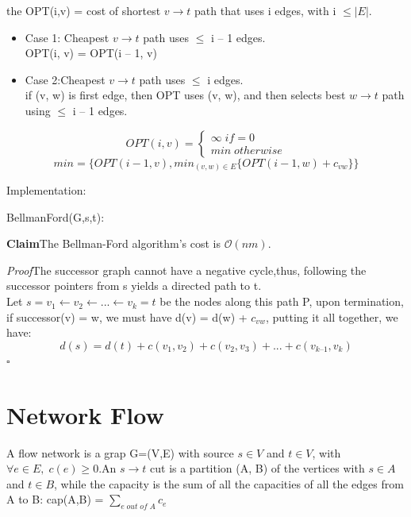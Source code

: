 \documentclass[11pt]{article}
\newenvironment{claim}[1]{\par\textbf{Claim}\space#1}{}
\newenvironment{proof}[1]{\par\textit{Proof}\space#1}{\hfill\ensuremath{\square}}
\begin{document}
the OPT(i,v) = cost of shortest $v\rightarrow t$ path that uses i edges, with i $\leq |E|$.

\begin{itemize}

\item {Case 1: Cheapest  $v\rightarrow t$ path uses $\leq$ i – 1 edges.}\\
OPT(i, v) = OPT(i – 1, v)

\item {Case 2:Cheapest  $v\rightarrow t$ path uses $\leq$ i edges.}\\
if (v, w) is first edge, then OPT uses (v, w), and then selects best $w \rightarrow t$ path using $\leq$ i – 1 edges.


\end{itemize}

\[OPT(i,v) = \begin{cases} \infty \; if = 0  \\ min \; otherwise \end{cases}\]
\[min= \{ OPT(i-1,v),min_{(v,w) \in E} \{OPT(i−1, w)+c_{vw} \}\} \]

Implementation:

\begin{algorithm}[H]
\SetAlgoLined
\small
{}

\BlankLine
	

\BlankLine

\caption{BellmanFord(G,s,t):}
\end{algorithm}

\begin{claim}
The Bellman-Ford algorithm's cost is $\mathcal{O}{(nm)}$.
\end{claim}
\begin{proof}
The successor graph cannot have a negative cycle,thus, following the successor pointers from s yields a directed path to t.\\
Let $s = v_{1} \leftarrow v_{2} \leftarrow ... \leftarrow v_{k} = t$ be the nodes along this path P, upon termination, if successor(v) = w, we must have d(v) = d(w) + $c_{vw}$, putting it all together, we have:
	\[d(s) = d(t) + c(v_{1}, v_{2}) + c(v_{2}, v_{3}) + ... + c(v_{k–1}, v_{k})\]
\end{proof}


\clearpage

\section{Network Flow}
A flow network is a grap G=(V,E) with source $s \in V$ and $t \in V$, with $\forall e \in E, \; c(e) \geq 0$.An $s \rightarrow t$ cut is a partition (A, B) of the vertices with $s \in A$ and $ t \in B$, while the capacity is the sum of all the capacities of all the edges from A to B: cap(A,B) = $ \sum_{e \; out \; of \; A}^{} c_{e}$
\end{document}
